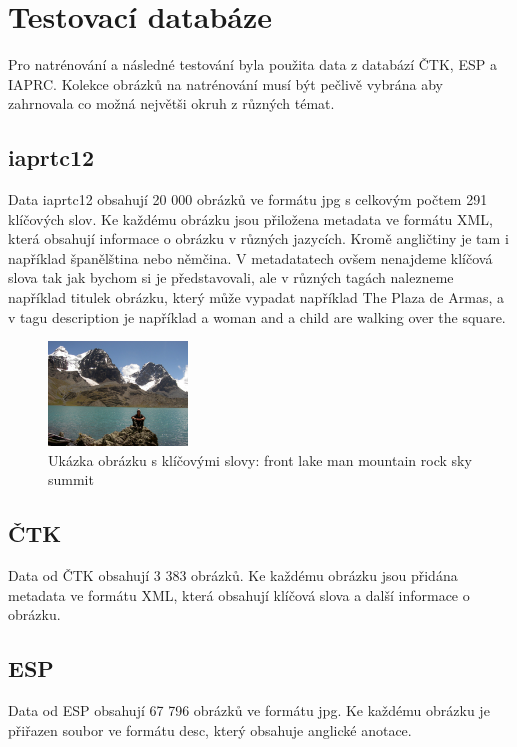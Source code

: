 \documentclass[czech,BP]{thesiskiv}
\begin{document}
\chapter{Testovací databáze}
Pro natrénování a následné testování byla použita data z databází ČTK, ESP a IAPRC. Kolekce obrázků na natrénování musí být pečlivě vybrána aby zahrnovala co možná největši okruh z různých témat.

\section{iaprtc12}
Data iaprtc12 obsahují 20 000 obrázků ve formátu jpg s celkovým počtem 291 klíčových slov. Ke každému obrázku jsou přiložena metadata ve formátu XML, která obsahují informace o obrázku v různých jazycích. Kromě angličtiny je tam i například španělština nebo němčina. V metadatatech ovšem nenajdeme klíčová slova tak jak bychom si je představovali, ale v různých tagách nalezneme například titulek obrázku, který může vypadat například The Plaza de Armas, a v tagu description je například  a woman and a child are walking over the square.

\begin{figure}[h]
		\centering
		\includegraphics[width=140px]{./img/iaprtc12.jpg}	
		\caption{Ukázka obrázku s klíčovými slovy: front lake man mountain rock sky summit}
\end{figure}

\section{ČTK}
Data od ČTK obsahují 3 383 obrázků. Ke každému obrázku jsou přidána metadata ve formátu XML, která obsahují klíčová slova a další informace o obrázku. 

\section{ESP}
Data od ESP obsahují 67 796 obrázků ve formátu jpg. Ke každému obrázku je přiřazen soubor ve formátu desc, který obsahuje anglické anotace.
\end{document}
